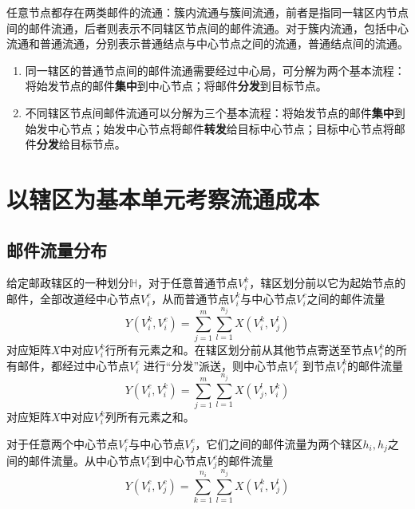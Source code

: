 任意节点都存在两类邮件的流通：簇内流通与簇间流通，前者是指同一辖区内节点间的邮件流通，后者则表示不同辖区节点间的邮件流通。对于簇内流通，包括中心流通和普通流通，分别表示普通结点与中心节点之间的流通，普通结点间的流通。
\begin{enumerate}[假设1]
  \item 同一辖区的普通节点间的邮件流通需要经过中心局，可分解为两个基本流程：将始发节点的邮件\textbf{集中}到中心节点；将邮件\textbf{分发}到目标节点。
  \item 不同辖区节点间邮件流通可以分解为三个基本流程：将始发节点的邮件\textbf{集中}到始发中心节点；始发中心节点将邮件\textbf{转发}给目标中心节点；目标中心节点将邮件\textbf{分发}给目标节点。
\end{enumerate}

\section{以辖区为基本单元考察流通成本}
\subsection{邮件流量分布}
给定邮政辖区的一种划分$\mathbb{H}$，对于任意普通节点$V_i^k$，辖区划分前以它为起始节点的邮件，全部改道经中心节点$V_i^c$，从而普通节点$V_i^k$与中心节点$V_i^c$之间的邮件流量
\begin{equation}
    Y(V_i^k, V_i^c) = \sum\limits_{j = 1}^m \sum\limits_{l = 1}^{n_j} X(V_i^k, V_j^l)
\end{equation}
对应矩阵$X$中对应$V_i^k$行所有元素之和。在辖区划分前从其他节点寄送至节点$V_i^k$的所有邮件，都经过中心节点$V_i^c$ 进行“分发”派送，则中心节点$V_i^c$ 到节点$V_i^k$的邮件流量
\begin{equation}
    Y(V_i^c, V_i^k) = \sum\limits_{j = 1}^m \sum\limits_{l = 1}^{n_j} X(V_j^l, V_i^k)
\end{equation}
对应矩阵$X$中对应$V_i^k$列所有元素之和。

对于任意两个中心节点$V_i^c$与中心节点$V_j^c$，它们之间的邮件流量为两个辖区$h_i,h_j$之间的邮件流量。从中心节点$V_i^c$到中心节点$V_j^c$的邮件流量
\begin{equation}
    Y(V_i^c, V_j^c) = \sum\limits_{k = 1}^{n_i} \sum\limits_{l = 1}^{n_j} X(V_i^k, V_j^l)
\end{equation}

